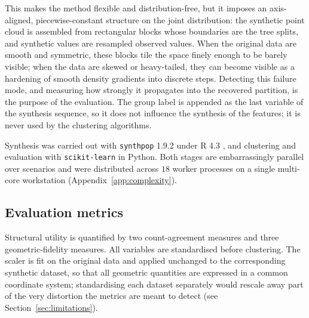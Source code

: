 \documentclass[pdflatex,sn-basic]{sn-jnl}
\begin{document}
This makes the method flexible and distribution-free, but it imposes an
axis-aligned, piecewise-constant structure on the joint distribution: the
synthetic point cloud is assembled from rectangular blocks whose boundaries are
the tree splits, and synthetic values are resampled observed values. When the
original data are smooth and symmetric, these blocks tile the space finely
enough to be barely visible; when the data are skewed or heavy-tailed, they can
become visible as a hardening of smooth density gradients into discrete steps.
Detecting this failure mode, and measuring how strongly it propagates into the
recovered partition, is the purpose of the evaluation. The group label is
appended as the last variable of the synthesis sequence, so it does not
influence the synthesis of the features; it is never used by the clustering
algorithms.

Synthesis was carried out with \texttt{synthpop} 1.9.2 \citep{nowok2016} under
\textsf{R} 4.3 \citep{rcore2024}, and clustering and evaluation with
\texttt{scikit-learn} \citep{pedregosa2011} in Python. Both stages are
embarrassingly parallel over scenarios and were distributed across $18$ worker
processes on a single multi-core workstation (Appendix~\ref{app:complexity}).

\subsection{Evaluation metrics}
\label{sec:metrics}

Structural utility is quantified by two count-agreement measures and three
geometric-fidelity measures. All variables are standardised before clustering.
The scaler is fit on the original data and applied unchanged to the
corresponding synthetic dataset, so that all geometric quantities are
expressed in a common coordinate system; standardising each dataset separately
would rescale away part of the very distortion the metrics are meant to detect
(see Section~\ref{sec:limitations}).
\end{document}
